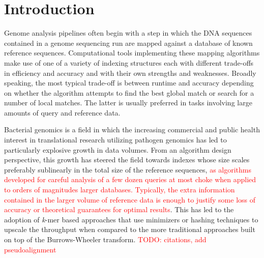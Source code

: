 \documentclass[unnumsec,webpdf,contemporary,large]{oup-authoring-template}%
\theoremstyle{thmstyleone}%
\theoremstyle{thmstyletwo}%
\theoremstyle{thmstylethree}%
\begin{document}

\maketitle


\section{Introduction}
Genome analysis pipelines often begin with a step in which the DNA sequences contained in a 
genome sequencing run
are mapped against a database of known reference sequences. Computational tools implementing these mapping algorithms make use of one of a variety of indexing structures each with different trade-offs in efficiency and accuracy and with their own strengths and weaknesses. Broadly speaking, the most typical trade-off is between runtime and accuracy depending on whether the algorithm attempts to find the best global match or search for a number of local matches. The latter is usually preferred in tasks involving large amounts of query and reference data.

Bacterial genomics is a field in which the increasing commercial and public health interest in translational research utilizing pathogen genomics has led to particularly explosive growth in data volumes. From an algorithm design perspective, this growth has steered the field towards indexes whose size scales preferably sublinearly in the total size of the reference sequences, \textcolor{red}{as algorithms developed for careful analysis of a few dozen queries at most choke when applied to orders of magnitudes larger databases. Typically, the extra information contained in the larger volume of reference data is enough to justify some loss of accuracy or theoretical guarantees for optimal results}. This has led to the adoption of \emph{k}-mer based approaches that use minimizers or hashing techniques to upscale the throughput when compared to the more traditional approaches built on top of the Burrows-Wheeler transform. \textcolor{red}{TODO: citations, add pseudoalignment}
\end{document}
